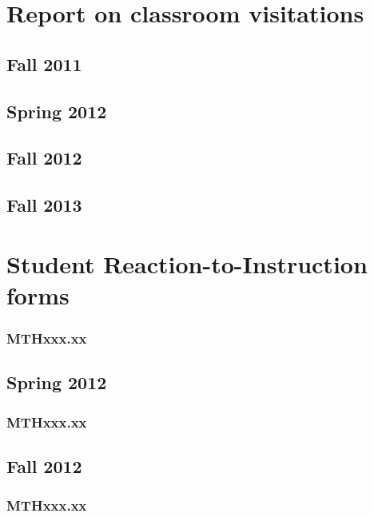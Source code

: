 \documentclass[ openright,titlepage,numbers=noenddot,headinclude,%
                footinclude=true,cleardoublepage=empty,abstractoff, 
                BCOR=5mm,paper=letter,fontsize=11pt,%
                ngerman, american, %
                ]{scrreprt}
\begin{document}
\section{Report on classroom visitations}
\subsection{Fall 2011}

\subsection{Spring 2012}

\subsection{Fall 2012}

\subsection{Fall 2013}


\section{Student Reaction-to-Instruction forms}
\subsubsection{MTHxxx.xx}



\subsection{Spring 2012}
\subsubsection{MTHxxx.xx}




\subsection{Fall 2012}
\subsubsection{MTHxxx.xx}

\end{document}
